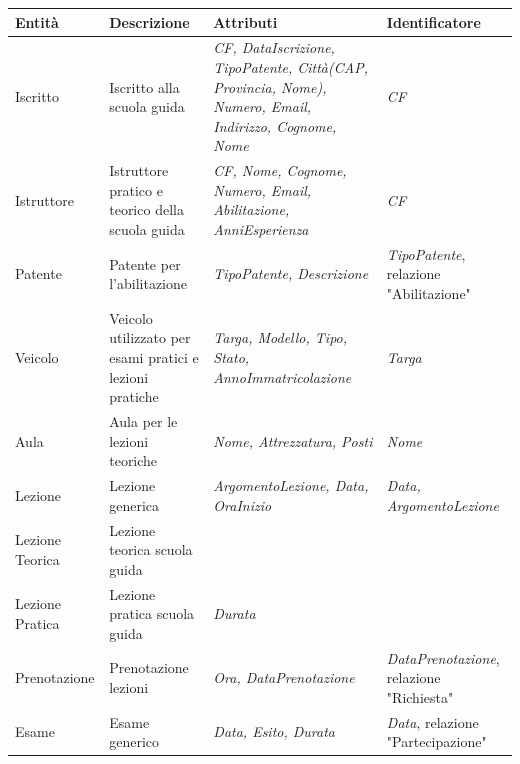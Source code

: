 \documentclass[10pt,twoside]{article}
\begin{document}
{     \begin{table}[H]
        \centering
        \begin{tabularx}{\textwidth}{|>{\centering\arraybackslash}p{2.6cm}|>{\centering\arraybackslash}X|>{\centering\arraybackslash}p{4.85cm}|>{\centering\arraybackslash}X|}
            \hline
            \rowcolor{lightgray!40}
            \textbf{Entità} & \textbf{Descrizione} & \textbf{Attributi} & \textbf{Identificatore} \\
            \hline
            \rowcolor{white!40}
            Iscritto & Iscritto alla scuola guida & \textit{CF, DataIscrizione, TipoPatente, Città(CAP, Provincia, Nome), Numero, Email, Indirizzo, Cognome, Nome} & \textit{CF}\\
            \hline
            \rowcolor{white!40}
            Istruttore & Istruttore pratico e teorico della scuola guida & \textit{CF, Nome, Cognome, Numero, Email, Abilitazione, AnniEsperienza} & \textit{CF} \\
            \hline
            \rowcolor{white!40}
            Patente & Patente per l'abilitazione & \textit{TipoPatente, Descrizione} & \textit{TipoPatente}, relazione "Abilitazione"\\
            \hline
            \rowcolor{white!40}
            Veicolo & Veicolo utilizzato per esami pratici e lezioni pratiche & \textit{Targa, Modello, Tipo, Stato, AnnoImmatricolazione} & \textit{Targa}\\
            \hline
            \rowcolor{white!40}
            Aula & Aula per le lezioni teoriche & \textit{Nome, Attrezzatura, Posti} & \textit{Nome}\\
            \hline
            \rowcolor{white!40}
            Lezione & Lezione generica & \textit{ArgomentoLezione, Data, OraInizio} & \textit{Data, ArgomentoLezione}\\
            \hline
            \rowcolor{white!40}
            Lezione Teorica & Lezione teorica scuola guida & & \\
            \hline
            \rowcolor{white!40}
            Lezione Pratica & Lezione pratica scuola guida & \textit{Durata} & \\
            \hline
            \rowcolor{white!40}
            Prenotazione & Prenotazione lezioni & \textit{Ora, DataPrenotazione} & \textit{DataPrenotazione}, relazione "Richiesta"\\
            \hline
            \rowcolor{white!40}
            Esame & Esame generico & \textit{Data, Esito, Durata} & \textit{Data}, relazione "Partecipazione"\\

\end{tabularx}
\end{table}}
\end{document}
